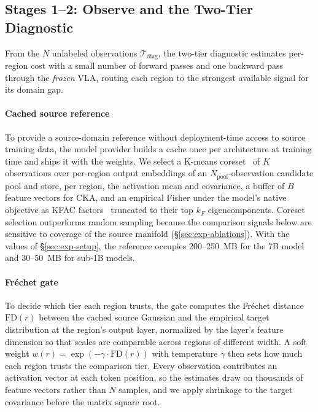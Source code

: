 

\subsection{Stages 1--2: Observe and the Two-Tier Diagnostic}
\label{sec:method-diagnose}



From the $N$ unlabeled observations $\mathcal{T}_\text{diag}$, the two-tier diagnostic estimates per-region cost with a small number of forward passes and one backward pass through the \emph{frozen} VLA, routing each region to the strongest available signal for its domain gap.

\paragraph{Cached source reference}
To provide a source-domain reference without deployment-time access to source training data, the model provider builds a cache once per architecture at training time and ships it with the weights.
We select a K-means coreset~\cite{HarPeled2007Coresets} of $K$ observations over per-region output embeddings of an $N_\text{pool}$-observation candidate pool and store, per region, the activation mean and covariance, a buffer of $B$ feature vectors for CKA, and an empirical Fisher under the model's native objective as KFAC factors~\cite{Martens2015KFAC} truncated to their top $k_F$ eigencomponents.
Coreset selection outperforms random sampling because the comparison signals below are sensitive to coverage of the source manifold (\S\ref{sec:exp-ablations}).
With the values of \S\ref{sec:exp-setup}, the reference occupies 200--250~MB for the 7B model and 30--50~MB for sub-1B models.

\paragraph{Fr\'{e}chet gate}
To decide which tier each region trusts, the gate computes the Fr\'{e}chet distance~\cite{Dowson1982Frechet} $\mathrm{FD}(r)$ between the cached source Gaussian and the empirical target distribution at the region's output layer, normalized by the layer's feature dimension so that scales are comparable across regions of different width.
A soft weight $w(r) = \exp(-\gamma \cdot \mathrm{FD}(r))$ with temperature $\gamma$ then sets how much each region trusts the comparison tier.
Every observation contributes an activation vector at each token position, so the estimates draw on thousands of feature vectors rather than $N$ samples, and we apply shrinkage to the target covariance before the matrix square root.


